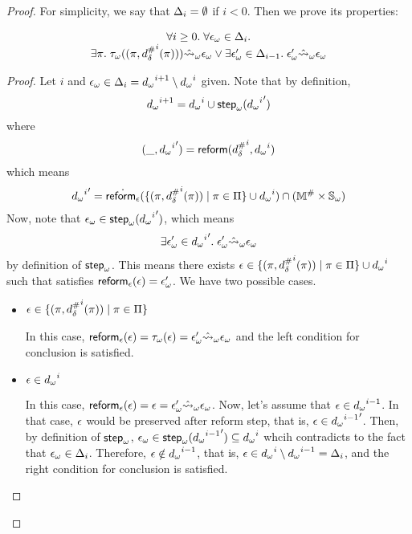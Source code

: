 \begin{proof}
For simplicity, we say that $\Delta_i = \emptyset$ if $i < 0$.
Then we prove its properties:
\begin{lemma}\label{lemma:diffset_prop}
  \[
    \begin{array}{c}
      \forall i \geq 0. \; \forall {\epsilon}_\omega \in \Delta_i. \\
      \exists \pi. \; {\tau}_\omega((\pi,{{d}^{\#}_\delta}^i(\pi))) \hat{\leadsto}_\omega {\epsilon}_\omega 
      \lor \exists {\epsilon}_\omega' \in \Delta_{i-1} . \; {\epsilon}_\omega' \hat{\leadsto}_\omega {\epsilon}_\omega
    \end{array}
  \]
\end{lemma}
\begin{proof}
  Let $i$ and ${\epsilon}_\omega \in \Delta_i = {{d}_\omega}^{i+1} \setminus {{d}_\omega}^i$ given.
  Note that by definition,
  \[
    {{d}_\omega}^{i+1} = {{d}_\omega}^i \cup {\textsf{step}}_\omega({{{d}_\omega}^i}')
  \]
  where
  \[
    (\_, {{{d}_\omega}^i}') = \textsf{reform}({{d}^{\#}_\delta}^i, {{d}_\omega}^i)
  \]
  which means
  \[
    {{{d}_\omega}^i}' =
    \dot{\textsf{reform}_\epsilon}(\{ (\pi, {{d}^{\#}_\delta}^i(\pi)) \mid \pi \in \Pi \} \cup {{d}_\omega}^i)
    \cap ({\mathbb{M}}^{\#} \times {\mathbb{S}}_\omega)
  \]
  Now, note that ${\epsilon}_\omega \in {\textsf{step}}_\omega({{{d}_\omega}^i}')$, which means
  \[
    \exists {\epsilon}_\omega' \in {{{d}_\omega}^i}'. \; {\epsilon}_\omega' \hat{\leadsto}_\omega {\epsilon}_\omega
  \] by definition of ${\textsf{step}}_\omega$.
  This means there exists $\epsilon \in \{ (\pi, {{d}^{\#}_\delta}^i(\pi)) \mid \pi \in \Pi \} \cup {{d}_\omega}^i$
  such that satisfies $\textsf{reform}_\epsilon(\epsilon) = {\epsilon}_\omega'$. We have two possible cases.
  \begin{itemize}
 
  \item $\epsilon \in \{ (\pi, {{d}^{\#}_\delta}^i(\pi)) \mid \pi \in \Pi \}$

  In this case, $\textsf{reform}_\epsilon(\epsilon) = {\tau}_\omega(\epsilon) = {\epsilon}_\omega'
  \hat{\leadsto}_\omega {\epsilon}_\omega$
  and the left condition for conclusion is satisfied.
  
  \item $\epsilon \in {{d}_\omega}^i$

  In this case, $\textsf{reform}_\epsilon(\epsilon) = \epsilon = {\epsilon}_\omega' \hat{\leadsto}_\omega {\epsilon}_\omega$.
  Now, let's assume that $\epsilon \in {{d}_\omega}^{i-1}$.
  In that case, $\epsilon$ would be preserved after reform step, that is,
  $\epsilon \in {{{d}_\omega}^{i-1}}'$. Then, by definition of ${\textsf{step}}_\omega$,
  ${\epsilon}_\omega \in {\textsf{step}}_\omega({{{d}_\omega}^{i-1}}') \subseteq {{d}_\omega}^i$
  whcih contradicts to the fact that ${\epsilon}_\omega \in \Delta_i$.
  Therefore, $\epsilon \notin {{d}_\omega}^{i-1}$, that is,
  $\epsilon \in {{d}_\omega}^i \setminus {{d}_\omega}^{i-1} = \Delta_i$,
  and the right condition for conclusion is satisfied.
  \end{itemize}
\end{proof}


\end{proof}
